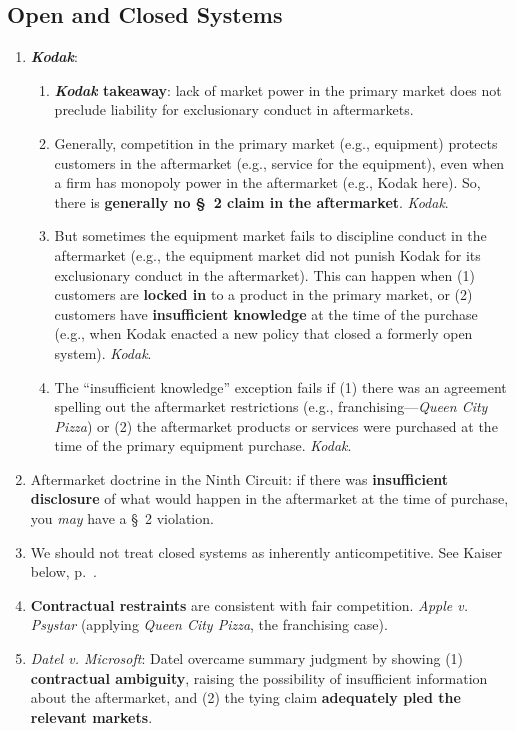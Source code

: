 \subsection{Open and Closed Systems}

\begin{enumerate}
    \item \textbf{\emph{Kodak}}:
    \begin{enumerate}
        \item \textbf{\emph{Kodak} takeaway}: lack of market power in the 
        primary market does not preclude liability for exclusionary conduct in 
        aftermarkets.
        \item Generally, competition in the primary market (e.g., equipment) 
        protects customers in the aftermarket (e.g., service for the 
        equipment), even when a firm has monopoly power in the aftermarket 
        (e.g., Kodak here).  So, there is \textbf{generally no \S\ 2 claim in 
        the aftermarket}.  \emph{Kodak}.
        \item But sometimes the equipment market fails to discipline conduct 
        in the aftermarket (e.g., the equipment market did not punish Kodak 
        for its exclusionary conduct in the aftermarket). This can happen when 
        (1) customers are \textbf{locked in} to a product in the primary 
        market, or (2) customers have \textbf{insufficient knowledge} at the 
        time of the purchase (e.g., when Kodak enacted a new policy that 
        closed a formerly open system). \emph{Kodak}.
        \item The ``insufficient knowledge'' exception fails if (1) there was 
        an agreement spelling out the aftermarket restrictions (e.g., 
        franchising---\emph{Queen City Pizza}) or (2) the aftermarket products 
        or services were purchased at the time of the primary equipment 
        purchase.  \emph{Kodak}.
    \end{enumerate}
    \item Aftermarket doctrine in the Ninth Circuit: if there was 
    \textbf{insufficient disclosure} of what would happen in the aftermarket 
    at the time of purchase, you \emph{may} have a \S\ 2 violation.
    \item We should not treat closed systems as inherently anticompetitive. 
    See Kaiser below, p.~\pageref{sub:kaiser-closed-systems}.
    \item \textbf{Contractual restraints} are consistent with fair 
    competition. \emph{Apple v. Psystar} (applying \emph{Queen City Pizza}, 
    the franchising case).
    \item \emph{Datel v. Microsoft}: Datel overcame summary judgment by 
    showing (1) \textbf{contractual ambiguity}, raising the possibility of 
    insufficient information about the aftermarket, and (2) the tying claim 
    \textbf{adequately pled the relevant markets}.
\end{enumerate}

